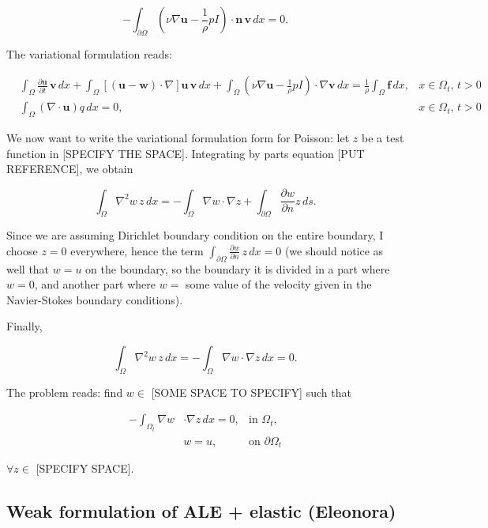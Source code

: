 \documentclass[11pt,a4paper,titlepage]{report}
\begin{document}
\[- \int_{\partial \Omega} (\nu \nabla \mathbf{u} -  \frac{1}{\rho}  pI) \cdot \mathbf{n} \, \mathbf{v} \, dx = 0.\]

The variational formulation reads:

\[
\begin{aligned}
& \int_{\Omega} \frac{\partial \mathbf{u}}{\partial t} \, \mathbf{v} \, dx 
+ \int_{\Omega} [(\mathbf{u - w}) \cdot \nabla] \mathbf{u} \, \mathbf{v} \, dx
+ \int_{\Omega} (\nu \nabla \mathbf{u} -  \frac{1}{\rho}  pI) \cdot \nabla \mathbf{v} \, dx
=  \frac{1}{\rho} \int_{\Omega} \mathbf{f} \, dx,  & x \in \Omega_t, \, t>0 \\
& \int_{\Omega} ( \nabla \cdot \mathbf{u} ) q \, dx = 0 , & x \in \Omega_t, \, t>0
\end{aligned}
\]

We now want to write the variational formulation form for Poisson: let $z$ be a test function in [SPECIFY THE SPACE]. Integrating by parts equation [PUT REFERENCE], we obtain

\[
\int_{\Omega} \nabla^2 w \, z \, dx = - \int_{\Omega} \nabla w \cdot \nabla z + \int_{\partial \Omega} \frac{\partial w}{\partial n} z \, ds.
\]

Since we are assuming Dirichlet boundary condition on the entire boundary, I choose $z = 0$ everywhere, hence the term $\int_{\partial \Omega} \frac{\partial w}{\partial n} \, z \, dx  = 0 $ (we should notice as well that $w = u$ on the boundary, so the boundary it is divided in a part where $w = 0$, and another part where $w = $ some value of the velocity given in the Navier-Stokes boundary conditions). 

Finally,

\[
\int_{\Omega} \nabla^2 w \, z \, dx = - \int_{\Omega} \nabla w \cdot \nabla z \, dx = 0.
\]

The problem reads: find $w \in$ [SOME SPACE TO SPECIFY] such that

\[
\begin{aligned}
-  \int_{\Omega_t} \nabla w & \cdot \nabla z \, dx = 0, & \text{in } \Omega_t, \\
& w = u, & \text{on } \partial \Omega_t
\end{aligned}
\]

$\forall z \in $ [SPECIFY SPACE].


\subsection{Weak formulation of  ALE + elastic (Eleonora)}
\end{document}
